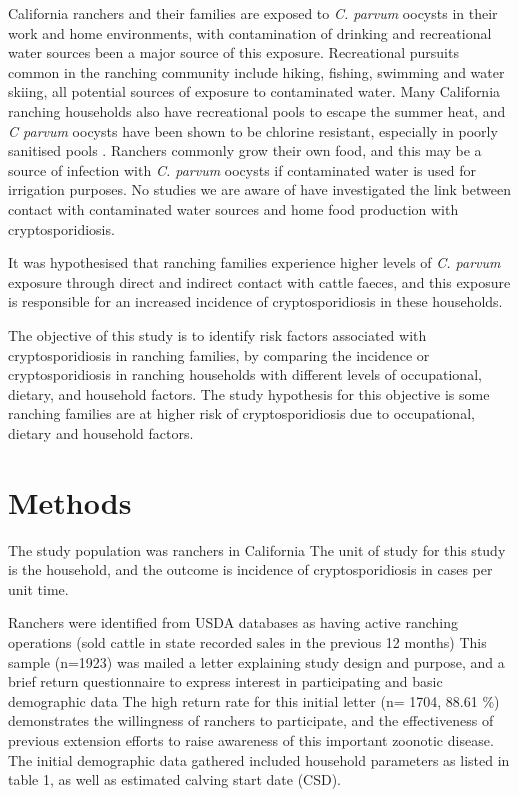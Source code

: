 \documentclass[12pt]{article}
\begin{document}
	California ranchers and their families are exposed to \emph{C. parvum} oocysts in their work and home environments, with contamination of drinking and recreational water sources been a major source of this exposure.
	Recreational pursuits common in the ranching community include hiking, fishing, swimming and water skiing, all potential sources of exposure to contaminated water. 
	Many California ranching households also have recreational pools to escape the summer heat, and \emph{C parvum} oocysts have been shown to be chlorine resistant, especially in poorly sanitised pools \cite{Carpenter1999}.
	Ranchers commonly grow their own food, and this may be a source of infection with \emph{C. parvum} oocysts if contaminated water is used for irrigation purposes.
	No studies we are aware of have investigated the link between contact with contaminated water sources and home food production with cryptosporidiosis. 


	It was hypothesised that ranching families experience higher levels of \emph{C. parvum} exposure through direct and indirect contact with cattle faeces, and this exposure is responsible for an increased incidence of cryptosporidiosis in these households.

		
	The objective of this study is to identify risk factors associated with cryptosporidiosis in ranching families, by comparing the incidence or cryptosporidiosis in ranching households with different levels of occupational, dietary, and household factors.
	The study hypothesis for this objective is some ranching families are at higher risk of cryptosporidiosis due to occupational, dietary and household factors.


	\section{Methods} 
		The study population was ranchers in California 
	The unit of study for this study is the household, and the outcome is incidence of cryptosporidiosis in cases per unit time.


		Ranchers were identified from USDA databases as having active ranching operations (sold cattle in state recorded sales in the previous 12 months)
		This sample (n=1923) was mailed a letter explaining study design and purpose, and a brief return questionnaire to express interest in participating and basic demographic data 
		The high return rate for this initial letter (n= 1704, 88.61 \%) demonstrates the willingness of ranchers to participate, and the effectiveness of previous extension efforts to raise awareness of this important zoonotic disease. 
		The initial demographic data gathered included household parameters as listed in table 1, as well as estimated calving start date (CSD).
\end{document}
